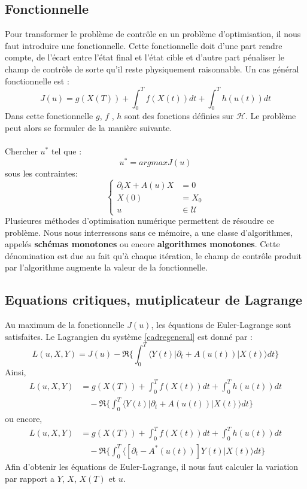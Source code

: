 \subsection{Fonctionnelle}
Pour transformer le problème de contrôle en un problème d’optimisation, il nous faut introduire une fonctionnelle. Cette fonctionnelle doit d’une part rendre compte, de l’écart entre l'état final et l'état cible et d’autre part pénaliser le champ de contrôle de sorte qu’il reste physiquement raisonnable. Un cas général fonctionnelle est :
\begin{equation}
J(u)=g(X(T))+\int_{0}^{T} f(X(t))dt+\int_{0}^{T} h(u(t))dt
\end{equation}
Dans cette fonctionnelle $g$, $f$ , $h$ sont des fonctions définies sur $\mathcal{H}$. Le problème peut alors se formuler de la manière suivante.\\\\
Chercher $u^*$ tel que :
\begin{equation*}
u^*=argmaxJ(u)
\end{equation*}
sous les contraintes:
\begin{equation*}
\begin{cases}
\partial_{t}X +A(u)X &= 0\\
X(0) &=X_0\\
u &\in \mathcal{U}
\end{cases}
\end{equation*}
Plusieures méthodes d'optimisation numérique permettent de résoudre ce problème. Nous nous interressons sans ce mémoire, a une classe d’algorithmes, appelés \textbf{schémas monotones} ou encore \textbf{algorithmes monotones}. Cette dénomination est due au fait qu’à chaque itération, le champ de contrôle produit par l’algorithme augmente la valeur de la fonctionnelle.
\subsection{Equations critiques, mutiplicateur de Lagrange}
Au maximum de la fonctionnelle $J(u)$, les équations de Euler-Lagrange sont satisfaites. Le Lagrangien du système \eqref{cadregeneral} est donné par :
\begin{equation}
L(u,X,Y)= J(u) -\Re \bigg\{ \int_{0}^{T}\langle Y (t)|\partial_{t}+A(u(t))|X(t) \rangle dt \bigg\}
\end{equation}
Ainsi,
\begin{align*}
L(u,X,Y)&= g(X(T))+\int_{0}^{T} f(X(t))dt+\int_{0}^{T} h(u(t))dt\\
&\quad -\Re \bigg\{ \int_{0}^{T}\langle Y (t)|\partial_{t}+A(u(t))|X(t) \rangle dt \bigg\}
\end{align*}
ou encore,
\begin{align*}
L(u,X,Y)&= g(X(T))+\int_{0}^{T} f(X(t))dt+\int_{0}^{T} h(u(t))dt\\
&\quad -\Re \bigg\{ \int_{0}^{T}\langle [\partial_{t}-A^*(u(t))]Y (t)|X(t) \rangle dt \bigg\}
\end{align*}
Afin d'obtenir les équations de Euler-Lagrange, il nous faut calculer la variation par rapport a $Y$, $X$, $X(T)$ et $u$.
